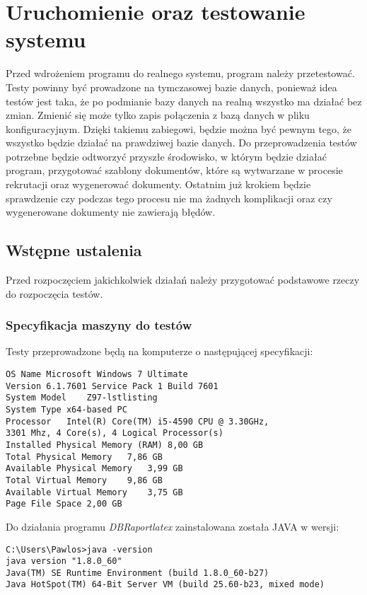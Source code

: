 \chapter{Uruchomienie oraz testowanie systemu}
Przed wdrożeniem programu do realnego systemu, program należy przetestować. Testy powinny być prowadzone na tymczasowej bazie danych, ponieważ idea testów jest taka, że po podmianie bazy danych na realną wszystko ma działać bez zmian. Zmienić się może tylko zapis połączenia z bazą danych w pliku konfiguracyjnym. Dzięki takiemu zabiegowi, będzie można być pewnym tego, że wszystko będzie działać na prawdziwej bazie danych.  Do przeprowadzenia testów potrzebne będzie odtworzyć przyszłe środowisko, w którym będzie działać program, przygotować szablony dokumentów, które są wytwarzane w procesie rekrutacji oraz wygenerować dokumenty. Ostatnim już krokiem będzie sprawdzenie czy podczas tego procesu nie ma żadnych komplikacji oraz czy wygenerowane dokumenty nie zawierają błędów.
\section{Wstępne ustalenia}

Przed rozpoczęciem jakichkolwiek działań należy przygotować podstawowe rzeczy do rozpoczęcia testów.

\subsection{Specyfikacja maszyny do testów}
Testy przeprowadzone będą na komputerze o następującej specyfikacji:
\begin{lstlisting}
OS Name	Microsoft Windows 7 Ultimate
Version	6.1.7601 Service Pack 1 Build 7601
System Model	Z97-lstlisting
System Type	x64-based PC
Processor	Intel(R) Core(TM) i5-4590 CPU @ 3.30GHz,
3301 Mhz, 4 Core(s), 4 Logical Processor(s)
Installed Physical Memory (RAM)	8,00 GB
Total Physical Memory	7,86 GB
Available Physical Memory	3,99 GB
Total Virtual Memory	9,86 GB
Available Virtual Memory	3,75 GB
Page File Space	2,00 GB
\end{lstlisting}

Do działania programu \emph{DBRaportlatex} zainstalowana została JAVA w wersji:
\begin{lstlisting}
C:\Users\Pawlos>java -version
java version "1.8.0_60"
Java(TM) SE Runtime Environment (build 1.8.0_60-b27)
Java HotSpot(TM) 64-Bit Server VM (build 25.60-b23, mixed mode)
\end{lstlisting}

